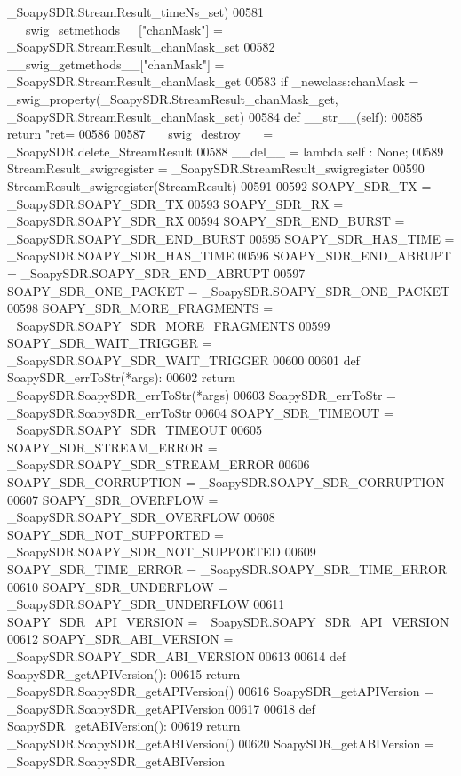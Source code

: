 \begin{DoxyCode}
{{{{      \_SoapySDR.StreamResult\_timeNs\_set)
00581     \_\_swig\_setmethods\_\_[\textcolor{stringliteral}{"chanMask"}] = \_SoapySDR.StreamResult\_chanMask\_set
00582     \_\_swig\_getmethods\_\_[\textcolor{stringliteral}{"chanMask"}] = \_SoapySDR.StreamResult\_chanMask\_get
00583     \textcolor{keywordflow}{if} \_newclass:chanMask = _swig_property(\_SoapySDR.StreamResult\_chanMask\_get, 
      \_SoapySDR.StreamResult\_chanMask\_set)
00584     \textcolor{keyword}{def }__str__(self):
00585         \textcolor{keywordflow}{return} \textcolor{stringliteral}{"ret=%
00586 
00587     \_\_swig\_destroy\_\_ = \_SoapySDR.delete\_StreamResult
00588     \_\_del\_\_ = \textcolor{keyword}{lambda} self : \textcolor{keywordtype}{None};
00589 StreamResult\_swigregister = \_SoapySDR.StreamResult\_swigregister
00590 StreamResult_swigregister(StreamResult)
00591 
00592 SOAPY\_SDR\_TX = \_SoapySDR.SOAPY\_SDR\_TX
00593 SOAPY\_SDR\_RX = \_SoapySDR.SOAPY\_SDR\_RX
00594 SOAPY\_SDR\_END\_BURST = \_SoapySDR.SOAPY\_SDR\_END\_BURST
00595 SOAPY\_SDR\_HAS\_TIME = \_SoapySDR.SOAPY\_SDR\_HAS\_TIME
00596 SOAPY\_SDR\_END\_ABRUPT = \_SoapySDR.SOAPY\_SDR\_END\_ABRUPT
00597 SOAPY\_SDR\_ONE\_PACKET = \_SoapySDR.SOAPY\_SDR\_ONE\_PACKET
00598 SOAPY\_SDR\_MORE\_FRAGMENTS = \_SoapySDR.SOAPY\_SDR\_MORE\_FRAGMENTS
00599 SOAPY\_SDR\_WAIT\_TRIGGER = \_SoapySDR.SOAPY\_SDR\_WAIT\_TRIGGER
00600 
00601 \textcolor{keyword}{def }SoapySDR_errToStr(*args):
00602   \textcolor{keywordflow}{return} \_SoapySDR.SoapySDR\_errToStr(*args)
00603 SoapySDR\_errToStr = \_SoapySDR.SoapySDR\_errToStr
00604 SOAPY\_SDR\_TIMEOUT = \_SoapySDR.SOAPY\_SDR\_TIMEOUT
00605 SOAPY\_SDR\_STREAM\_ERROR = \_SoapySDR.SOAPY\_SDR\_STREAM\_ERROR
00606 SOAPY\_SDR\_CORRUPTION = \_SoapySDR.SOAPY\_SDR\_CORRUPTION
00607 SOAPY\_SDR\_OVERFLOW = \_SoapySDR.SOAPY\_SDR\_OVERFLOW
00608 SOAPY\_SDR\_NOT\_SUPPORTED = \_SoapySDR.SOAPY\_SDR\_NOT\_SUPPORTED
00609 SOAPY\_SDR\_TIME\_ERROR = \_SoapySDR.SOAPY\_SDR\_TIME\_ERROR
00610 SOAPY\_SDR\_UNDERFLOW = \_SoapySDR.SOAPY\_SDR\_UNDERFLOW
00611 SOAPY\_SDR\_API\_VERSION = \_SoapySDR.SOAPY\_SDR\_API\_VERSION
00612 SOAPY\_SDR\_ABI\_VERSION = \_SoapySDR.SOAPY\_SDR\_ABI\_VERSION
00613 
00614 \textcolor{keyword}{def }SoapySDR_getAPIVersion():
00615   \textcolor{keywordflow}{return} \_SoapySDR.SoapySDR\_getAPIVersion()
00616 SoapySDR\_getAPIVersion = \_SoapySDR.SoapySDR\_getAPIVersion
00617 
00618 \textcolor{keyword}{def }SoapySDR_getABIVersion():
00619   \textcolor{keywordflow}{return} \_SoapySDR.SoapySDR\_getABIVersion()
00620 SoapySDR\_getABIVersion = \_SoapySDR.SoapySDR\_getABIVersion
}}}}}
\end{DoxyCode}
